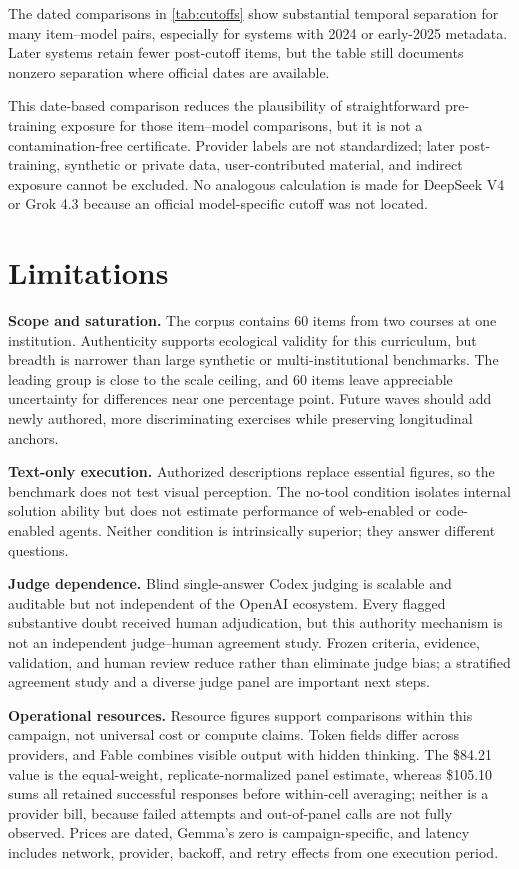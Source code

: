 \documentclass[11pt,a4paper,twocolumn]{article}
\begin{document}
The dated comparisons in \cref{tab:cutoffs} show substantial temporal
separation for many item--model pairs, especially for systems with 2024 or
early-2025 metadata. Later systems retain fewer post-cutoff items, but the table
still documents nonzero separation where official dates are available.

This date-based comparison reduces the plausibility of straightforward
pre-training exposure for those item--model comparisons, but it is not a
contamination-free certificate. Provider labels are not standardized; later
post-training, synthetic or private data,
user-contributed material, and indirect exposure cannot be excluded. No
analogous calculation is made for DeepSeek V4 or Grok 4.3 because an official
model-specific cutoff was not located.

\section{Limitations}\label{sec:limitations}

\textbf{Scope and saturation.}
The corpus contains 60 items from two courses at one institution. Authenticity
supports ecological validity for this curriculum, but breadth is narrower than
large synthetic or multi-institutional benchmarks. The leading group is close
to the scale ceiling, and 60 items leave appreciable uncertainty for differences
near one percentage point. Future waves should add newly authored, more
discriminating exercises while preserving longitudinal anchors.

\textbf{Text-only execution.}
Authorized descriptions replace essential figures, so the benchmark does not
test visual perception. The no-tool condition isolates internal solution
ability but does not estimate performance of web-enabled or code-enabled
agents. Neither condition is intrinsically superior; they answer different
questions.

\textbf{Judge dependence.}
Blind single-answer Codex judging is scalable and auditable but not independent
of the OpenAI ecosystem. Every flagged substantive doubt received human
adjudication, but this authority mechanism is not an independent judge--human
agreement study. Frozen criteria, evidence, validation, and human review reduce
rather than eliminate judge bias; a stratified agreement study and a diverse
judge panel are important next steps.

\textbf{Operational resources.}
Resource figures support comparisons within this campaign, not universal cost
or compute claims. Token fields differ across providers, and Fable combines
visible output with hidden thinking. The \$84.21 value is the equal-weight,
replicate-normalized panel estimate, whereas \$105.10 sums all retained
successful responses before within-cell averaging; neither is a provider bill,
because failed attempts and out-of-panel calls are not fully observed. Prices
are dated, Gemma's zero is campaign-specific, and latency includes network,
provider, backoff, and retry effects from one execution period.
\end{document}
